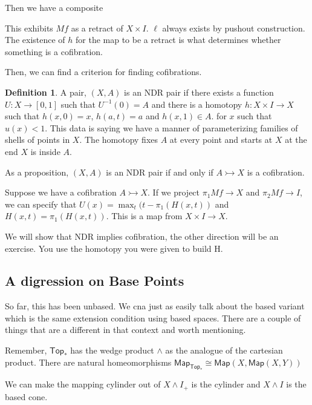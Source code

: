 \documentclass[10pt]{article}
\theoremstyle{definition}
\newtheorem{definition}[theorem]{Definition}
\begin{document}
	Then we have a composite\begin{center}
	\end{center}
	This exhibits $Mf$ as a retract of $X\times I$. $\ell$ always exists by pushout construction. The existence of $h$ for the map to be a retract is what determines whether something is a cofibration. 
	
	Then, we can find a criterion for finding cofibrations. 
	\begin{definition}
		A pair, $(X,A)$ is an NDR pair if there exists a function $U:X\to [0,1]$ such that $U^{-1}(0)=A$ and there is a homotopy $h:X\times I\to X$ such that $h(x,0)=x$, $h(a,t)=a$ and $h(x,1)\in A$. for $x$ such that $u(x)<1$. This data is saying we have a manner of parameterizing families of shells of points in $X$. The homotopy fixes $A$ at every point and starts at $X$ at the end $X$ is inside $A$.
	\end{definition}
	
	As a proposition, $(X,A)$ is an NDR pair if and only if $A\rightarrowtail X$ is a cofibration. 
	
	Suppose we have a cofibration $A\rightarrowtail X$. If we project $\pi_1 Mf\to X$ and $\pi_2 Mf\to I$, we can specify that $U(x)=\max_t(t-\pi_1(H(x,t))$ and $H(x,t)=\pi_1(H(x,t))$. This is a map from $X\times I\to X$. 
	
	We will show that NDR implies cofibration, the other direction will be an exercise. You use the homotopy you were given to build H.
	
	\subsection{A digression on Base Points}
	So far, this has been unbased. We cna just as easily talk about the based variant which is the same extension condition using based spaces. There are a couple of things that are a different in that context and worth mentioning. 
	
	Remember, $\mathsf{Top}_*$ has the wedge product $\wedge$ as the analogue of the cartesian product. There are natural homeomorphisms 
	$\mathsf{Map}_{\mathsf{Top}_*} \cong \mathsf{Map}(X,\mathsf{Map}(X,Y))$ 
	
	We can make the mapping cylinder out of $X\wedge I_+$ is the cylinder and $X\wedge I$ is the based cone. 
	
\end{document}
